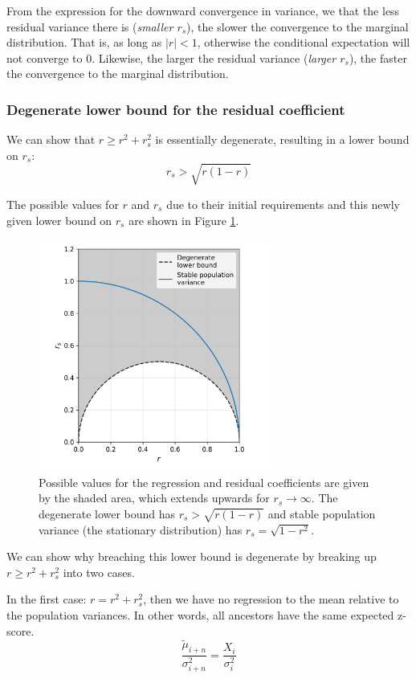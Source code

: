 \documentclass[letterpaper,10pt]{article} %
\begin{document}
From the expression for the downward convergence in variance, we that the less residual variance there is (\emph{smaller $r_s$}), the slower the convergence to the marginal distribution. That is, as long as $|r| < 1$, otherwise the conditional expectation will not converge to $0$. Likewise, the larger the residual variance (\emph{larger $r_s$}), the faster the convergence to the marginal distribution. 


\subsubsection*{Degenerate lower bound for the residual coefficient}
We can show that $r \geq r^2 + r_s^2$ is essentially degenerate, resulting in a lower bound on $r_s$:
$$r_s > \sqrt{r(1-r)}$$

The possible values for $r$ and $r_s$ due to their initial requirements and this newly given lower bound on $r_s$ are shown in Figure \ref{fig:possible_r_rs}. 

\begin{figure}[h]
\includegraphics[width=3in]{figures/possible_r_rs.png}
\centering
\caption{Possible values for the regression and residual coefficients are given by the shaded area, which extends upwards for $r_s \rightarrow \infty$. The degenerate lower bound has $r_s > \sqrt{r(1-r)}$ and stable population variance (the stationary distribution) has $r_s = \sqrt{1-r^2}$.}
\label{fig:possible_r_rs}
\end{figure}

We can show why breaching this lower bound is degenerate by breaking up $r \geq r^2 + r_s^2$ into two cases.

In the first case: $r = r^2 + r_s^2$, then we have no regression to the mean relative to the population variances. In other words, all ancestors have the same expected z-score.
$$\frac{\tilde{\mu}_{i+n}}{\sigma_{i+n}^2} = \frac{X_i}{\sigma_i^2}$$
\end{document}
